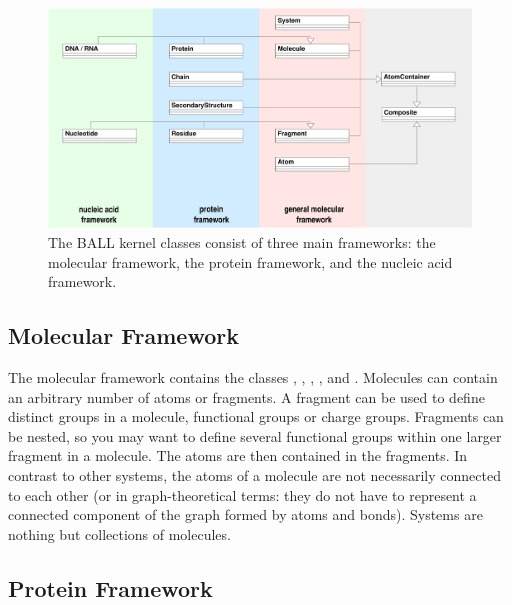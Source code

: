 \begin{figure}[tb]
  \centering\includegraphics[width=\textwidth]{kernel-data-structures}
  \caption{The BALL kernel classes consist of three main frameworks: the
           molecular framework, the protein framework, and the nucleic acid
           framework.}
  \label{figure:kernel-frameworks}
\end{figure}


\subsection{Molecular Framework}
\label{section:molecularframework}

The molecular framework contains the classes ,
, , , and . 
Molecules can contain an arbitrary number of atoms or fragments. A fragment
can be used to define distinct groups in a molecule, \eg functional groups or
charge groups. Fragments can be nested, so you may want to define several
functional groups within one larger fragment in a molecule. The atoms are then
contained in the fragments. In contrast to other systems, the atoms of a
molecule are not necessarily connected to each other (or in graph-theoretical
terms: they do not have to represent a connected component of the graph
formed by atoms and bonds). Systems are nothing but collections of molecules.


\subsection{Protein Framework}
\label{section:proteinframework}

